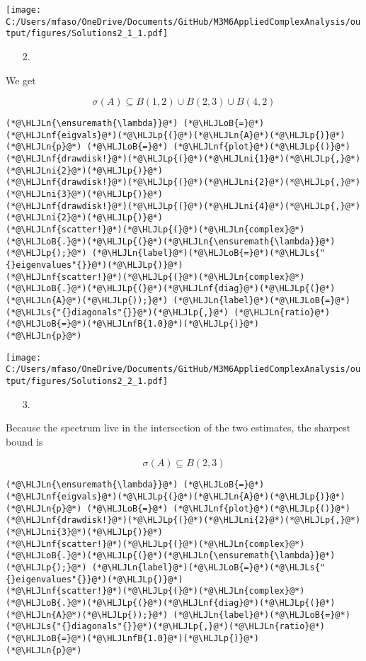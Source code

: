 \documentclass[12pt,a4paper]{article}
\newcommand{\HLJLn}[1]{#1}
\newcommand{\HLJLnf}[1]{\textcolor[RGB]{66,102,213}{#1}}
\newcommand{\HLJLs}[1]{\textcolor[RGB]{201,61,57}{#1}}
\newcommand{\HLJLnfB}[1]{\textcolor[RGB]{59,151,46}{#1}}
\newcommand{\HLJLni}[1]{\textcolor[RGB]{59,151,46}{#1}}
\newcommand{\HLJLoB}[1]{\textcolor[RGB]{102,102,102}{\textbf{#1}}}
\newcommand{\HLJLp}[1]{#1}
\begin{document}
\texttt{[image: C:/Users/mfaso/OneDrive/Documents/GitHub/M3M6AppliedComplexAnalysis/output/figures/Solutions2\_1\_1.pdf]}

\begin{itemize}
\item[2. ] \end{itemize}
We get

\[
\sigma(A) \subseteq B(1,2) \cup B(2,3) \cup B(4,2)
\]

\begin{lstlisting}
(*@\HLJLn{\ensuremath{\lambda}}@*) (*@\HLJLoB{=}@*) (*@\HLJLnf{eigvals}@*)(*@\HLJLp{(}@*)(*@\HLJLn{A}@*)(*@\HLJLp{)}@*)
(*@\HLJLn{p}@*) (*@\HLJLoB{=}@*) (*@\HLJLnf{plot}@*)(*@\HLJLp{()}@*)
(*@\HLJLnf{drawdisk!}@*)(*@\HLJLp{(}@*)(*@\HLJLni{1}@*)(*@\HLJLp{,}@*)(*@\HLJLni{2}@*)(*@\HLJLp{)}@*)
(*@\HLJLnf{drawdisk!}@*)(*@\HLJLp{(}@*)(*@\HLJLni{2}@*)(*@\HLJLp{,}@*)(*@\HLJLni{3}@*)(*@\HLJLp{)}@*)
(*@\HLJLnf{drawdisk!}@*)(*@\HLJLp{(}@*)(*@\HLJLni{4}@*)(*@\HLJLp{,}@*)(*@\HLJLni{2}@*)(*@\HLJLp{)}@*)
(*@\HLJLnf{scatter!}@*)(*@\HLJLp{(}@*)(*@\HLJLn{complex}@*)(*@\HLJLoB{.}@*)(*@\HLJLp{(}@*)(*@\HLJLn{\ensuremath{\lambda}}@*)(*@\HLJLp{);}@*) (*@\HLJLn{label}@*)(*@\HLJLoB{=}@*)(*@\HLJLs{"{}eigenvalues"{}}@*)(*@\HLJLp{)}@*)
(*@\HLJLnf{scatter!}@*)(*@\HLJLp{(}@*)(*@\HLJLn{complex}@*)(*@\HLJLoB{.}@*)(*@\HLJLp{(}@*)(*@\HLJLnf{diag}@*)(*@\HLJLp{(}@*)(*@\HLJLn{A}@*)(*@\HLJLp{));}@*) (*@\HLJLn{label}@*)(*@\HLJLoB{=}@*)(*@\HLJLs{"{}diagonals"{}}@*)(*@\HLJLp{,}@*) (*@\HLJLn{ratio}@*)(*@\HLJLoB{=}@*)(*@\HLJLnfB{1.0}@*)(*@\HLJLp{)}@*)
(*@\HLJLn{p}@*)
\end{lstlisting}

\texttt{[image: C:/Users/mfaso/OneDrive/Documents/GitHub/M3M6AppliedComplexAnalysis/output/figures/Solutions2\_2\_1.pdf]}

\begin{itemize}
\item[3. ] \end{itemize}
Because the spectrum live in the intersection of the two estimates, the sharpest bound is

\[
\sigma(A) \subseteq B(2,3)
\]

\begin{lstlisting}
(*@\HLJLn{\ensuremath{\lambda}}@*) (*@\HLJLoB{=}@*) (*@\HLJLnf{eigvals}@*)(*@\HLJLp{(}@*)(*@\HLJLn{A}@*)(*@\HLJLp{)}@*)
(*@\HLJLn{p}@*) (*@\HLJLoB{=}@*) (*@\HLJLnf{plot}@*)(*@\HLJLp{()}@*)
(*@\HLJLnf{drawdisk!}@*)(*@\HLJLp{(}@*)(*@\HLJLni{2}@*)(*@\HLJLp{,}@*)(*@\HLJLni{3}@*)(*@\HLJLp{)}@*)
(*@\HLJLnf{scatter!}@*)(*@\HLJLp{(}@*)(*@\HLJLn{complex}@*)(*@\HLJLoB{.}@*)(*@\HLJLp{(}@*)(*@\HLJLn{\ensuremath{\lambda}}@*)(*@\HLJLp{);}@*) (*@\HLJLn{label}@*)(*@\HLJLoB{=}@*)(*@\HLJLs{"{}eigenvalues"{}}@*)(*@\HLJLp{)}@*)
(*@\HLJLnf{scatter!}@*)(*@\HLJLp{(}@*)(*@\HLJLn{complex}@*)(*@\HLJLoB{.}@*)(*@\HLJLp{(}@*)(*@\HLJLnf{diag}@*)(*@\HLJLp{(}@*)(*@\HLJLn{A}@*)(*@\HLJLp{));}@*) (*@\HLJLn{label}@*)(*@\HLJLoB{=}@*)(*@\HLJLs{"{}diagonals"{}}@*)(*@\HLJLp{,}@*)(*@\HLJLn{ratio}@*)(*@\HLJLoB{=}@*)(*@\HLJLnfB{1.0}@*)(*@\HLJLp{)}@*)
(*@\HLJLn{p}@*)
\end{lstlisting}
\end{document}
